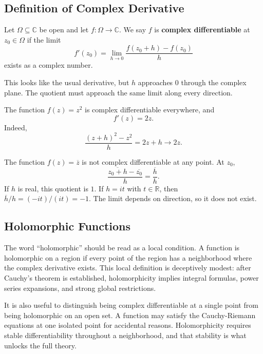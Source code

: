 \subsection{Definition of Complex Derivative}

\begin{definition}
Let $\Omega\subseteq\mathbb{C}$ be open and let $f:\Omega\to\mathbb{C}$. We say $f$ is \textbf{complex differentiable} at $z_0\in\Omega$ if the limit
\[
    f'(z_0)=\lim_{h\to 0}\frac{f(z_0+h)-f(z_0)}{h}
\]
exists as a complex number.
\end{definition}

This looks like the usual derivative, but $h$ approaches $0$ through the complex plane. The quotient must approach the same limit along every direction.

\begin{example}
The function $f(z)=z^2$ is complex differentiable everywhere, and
\[
    f'(z)=2z.
\]
Indeed,
\[
    \frac{(z+h)^2-z^2}{h}=2z+h\to 2z.
\]
\end{example}

\begin{example}
The function $f(z)=\overline{z}$ is not complex differentiable at any point. At $z_0$,
\[
    \frac{\overline{z_0+h}-\overline{z_0}}{h}=\frac{\overline{h}}{h}.
\]
If $h$ is real, this quotient is $1$. If $h=it$ with $t\in\mathbb{R}$, then $\overline{h}/h=(-it)/(it)=-1$. The limit depends on direction, so it does not exist.
\end{example}

\subsection{Holomorphic Functions}


The word ``holomorphic'' should be read as a local condition. A function is holomorphic on a region if every point of the region has a neighborhood where the complex derivative exists. This local definition is deceptively modest: after Cauchy's theorem is established, holomorphicity implies integral formulas, power series expansions, and strong global restrictions.

It is also useful to distinguish being complex differentiable at a single point from being holomorphic on an open set. A function may satisfy the Cauchy-Riemann equations at one isolated point for accidental reasons. Holomorphicity requires stable differentiability throughout a neighborhood, and that stability is what unlocks the full theory.

